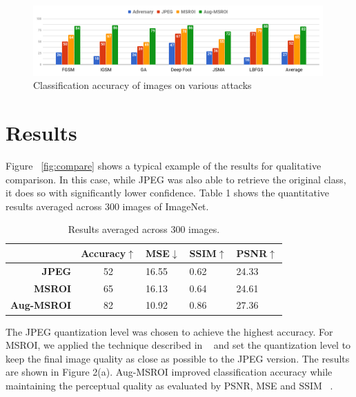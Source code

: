  
 \begin{figure}[H]
     \centering
     \includegraphics[width=0.99\textwidth,angle=0]{figures/protect/results.png}
     \caption[Classification accuracy of images on various attacks]{Classification accuracy of images on various attacks}
     \label{fig:numbers}
     \end{figure}

\section{Results}
Figure ~\ref{fig:compare} shows a typical example of the results for qualitative comparison. In this case, while JPEG was also able to retrieve the original class, it does so with significantly lower confidence. 
Table 1 shows the quantitative results averaged across 300 images of ImageNet.

\begin{table}[H]
\centering
\label{tbl:results}
\begin{tabular}{rclll}
\multicolumn{1}{l}{} & \textbf{Accuracy$\uparrow$} & \textbf{MSE$\downarrow$} & \textbf{SSIM$\uparrow$} & \textbf{PSNR$\uparrow$} \\ \hline
\textbf{JPEG}        & 52                & 16.55        & 0.62          & 24.33         \\
\textbf{MSROI}       & 65                & 16.13        & 0.64          & 24.61         \\
\textbf{Aug-MSROI}   & 82                & 10.92        & 0.86          & 27.36        
\end{tabular}
\caption[Quantitative results using Aug-MSROI]{Results averaged across $300$ images. }
\end{table}
 

The JPEG quantization level was chosen to achieve the highest accuracy. 
For MSROI, we applied the technique described in ~\cite{Prakash2017SemanticPI} and set the quantization level to keep the final image quality as close as possible to the JPEG version. The results are shown in Figure 2(a). %
Aug-MSROI improved classification accuracy while maintaining the perceptual quality as evaluated by PSNR, MSE and SSIM ~\cite{wang2004image}. %

